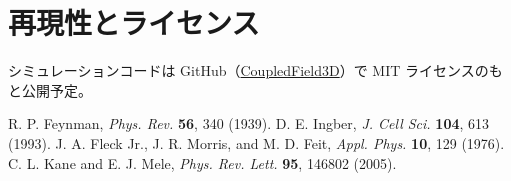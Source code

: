 \documentclass[a4paper,11pt,ja=standard]{bxjsarticle}
\begin{document}
\section*{再現性とライセンス}
シミュレーションコードは GitHub（\href{https://github.com/k-toppi/CoupledField3D}{CoupledField3D}）で MIT ライセンスのもと公開予定。

\FloatBarrier
\begin{thebibliography}{9}
 R. P. Feynman, \textit{Phys. Rev.} \textbf{56}, 340 (1939).
 D. E. Ingber, \textit{J. Cell Sci.} \textbf{104}, 613 (1993).
 J. A. Fleck Jr., J. R. Morris, and M. D. Feit, \textit{Appl. Phys.} \textbf{10}, 129 (1976).
 C. L. Kane and E. J. Mele, \textit{Phys. Rev. Lett.} \textbf{95}, 146802 (2005).
\end{thebibliography}
\end{document}
